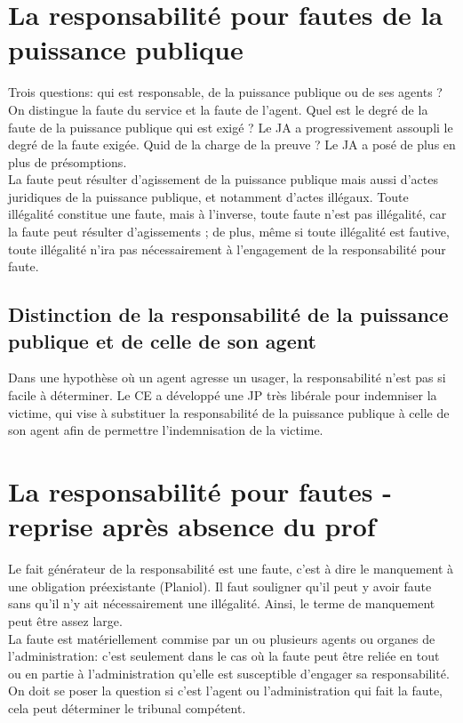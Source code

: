 \documentclass[10pt, a4paper, openany]{book}
\begin{document}
\chapter{La responsabilité pour fautes de la puissance publique}

Trois questions: qui est responsable, de la puissance publique ou de ses agents ? On distingue la faute du service et la faute de l'agent. Quel est le degré de la faute de la puissance publique qui est exigé ? Le JA a progressivement assoupli le degré de la faute exigée. Quid de la charge de la preuve ? Le JA a posé de plus en plus de présomptions. \\
La faute peut résulter d'agissement de la puissance publique mais aussi d'actes juridiques de la puissance publique, et notamment d'actes illégaux. Toute illégalité constitue une faute, mais à l'inverse, toute faute n'est pas illégalité, car la faute peut résulter d'agissements ; de plus, même si toute illégalité est fautive, toute illégalité n'ira pas nécessairement à l'engagement de la responsabilité pour faute. 

\section{Distinction de la responsabilité de la puissance publique et de celle de son agent}

Dans une hypothèse où un agent agresse un usager, la responsabilité n'est pas si facile à déterminer. Le CE a développé une JP très libérale pour indemniser la victime, qui vise à substituer la responsabilité de la puissance publique à celle de son agent afin de permettre l'indemnisation de la victime. 

\chapter{La responsabilité pour fautes - reprise après absence du prof}

Le fait générateur de la responsabilité est une faute, c'est à dire le manquement à une obligation préexistante (Planiol). Il faut souligner qu'il peut y avoir faute sans qu'il n'y ait nécessairement une illégalité. Ainsi, le terme de manquement peut être assez large. \\
La faute est matériellement commise par un ou plusieurs agents ou organes de l'administration: c'est seulement dans le cas où la faute peut être reliée en tout ou en partie à l'administration qu'elle est susceptible d'engager sa responsabilité. \\
On doit se poser la question si c'est l'agent ou l'administration qui fait la faute, cela peut déterminer le tribunal compétent. 
\end{document}

